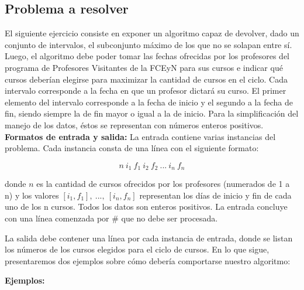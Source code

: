 \subsection{Problema a resolver}
El siguiente ejercicio consiste en exponer un algoritmo capaz de devolver, dado un conjunto de intervalos, el subconjunto máximo de los que no se solapan entre sí. Luego, el algoritmo debe poder tomar las fechas ofrecidas por los profesores del programa de Profesores Visitantes de la FCEyN para sus cursos e indicar qué cursos deberían elegirse para maximizar la cantidad de cursos en el ciclo. Cada intervalo corresponde a la fecha en que un profesor dictará su curso. El primer elemento del intervalo corresponde a la fecha de inicio y el segundo a la fecha de fin, siendo siempre la de fin mayor o igual a la de inicio. Para la simplificación del manejo de los datos, éstos se representan con números enteros positivos.\newline
\newline
\textbf {Formatos de entrada y salida:}\newline
\newline
La entrada contiene varias instancias del problema. Cada instancia consta de una línea con el siguiente formato:

$$n\ i_{1}\ f_{1}\ i_{2}\ f_{2}\ ...\ i_{n}\ f_{n}$$


donde \textbf{$n$} es la cantidad de cursos ofrecidos por los profesores (numerados de 1 a n) y los valores \textbf{$[i_{1},f_{1}],\ ...,\ [i_{n},f_{n}]$} representan los días de inicio y fin de cada uno de los n cursos. Todos los datos son enteros positivos. La entrada concluye con una línea comenzada por \# que no debe ser procesada.\newline

La salida debe contener una línea por cada instancia de entrada, donde se listan los números de los cursos elegidos para el ciclo de cursos.\newline
\newline
En lo que sigue, presentaremos dos ejemplos sobre cómo debería comportarse nuestro algoritmo:\newline

{\large{\textbf{Ejemplos:}}}\newline

